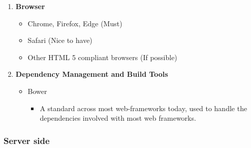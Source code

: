 \documentclass{article}
\begin{document}
\begin{enumerate}
\begin{itemize}
\begin{itemize}
				\end{itemize}
			\end{itemize}
			\item \textbf{Browser}
			\begin{itemize}
				\item Chrome, Firefox, Edge (Must)
				\item Safari (Nice to have)
				\item Other HTML 5 compliant browsers (If possible)
			\end{itemize}
			\item \textbf{Dependency Management and Build Tools}
			\begin{itemize}
				\item Bower
				\begin{itemize}
					\item A standard across most web-frameworks today, used to handle the dependencies involved with most web frameworks.
				\end{itemize}
			\end{itemize}
		\end{enumerate}
	
		\pagebreak
		
		\subsubsection{Server side}
		
\end{document}
